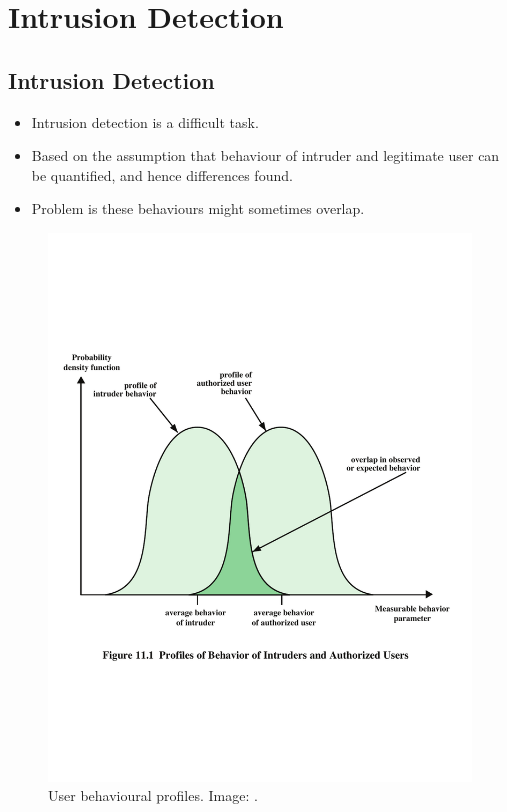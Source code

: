\section{Intrusion Detection}

\subsection{Intrusion Detection}

\begin{frame}
  \begin{itemize}
    \item Intrusion detection is a difficult task.

    \item Based on the assumption that behaviour of intruder and legitimate 
      user can be quantified, and hence differences found.

    \item Problem is these behaviours might sometimes overlap.

  \end{itemize}
\end{frame}

\begin{frame}
  \begin{figure}
    \includegraphics[height=0.7\textheight]{profiles.pdf}
    \caption{User behavioural profiles.
      Image: \cite{Stallings2013nse}.}
  \end{figure}
\end{frame}

